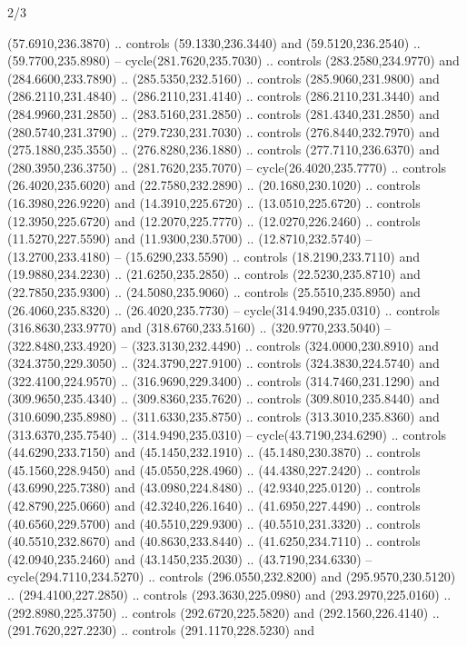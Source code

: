 \begin{flagdescription}{2/3}
\begin{scope}[xshift=0.5\flaglength,yshift=0.5\flagwidth,scale=\stretchfactor]
\begin{scope}[scale=0.001645\flagwidth,yshift=65mm,xshift=-63mm]
\begin{scope}[y=0.80pt, x=0.80pt, yscale=-1,]
\begin{scope}[cm={{1.33333,0.0,0.0,1.33333,(0.0,1e-05)}}]
  (57.6910,236.3870) .. controls (59.1330,236.3440) and (59.5120,236.2540) ..
  (59.7700,235.8980) -- cycle(281.7620,235.7030) .. controls (283.2580,234.9770)
  and (284.6600,233.7890) .. (285.5350,232.5160) .. controls (285.9060,231.9800)
  and (286.2110,231.4840) .. (286.2110,231.4140) .. controls (286.2110,231.3440)
  and (284.9960,231.2850) .. (283.5160,231.2850) .. controls (281.4340,231.2850)
  and (280.5740,231.3790) .. (279.7230,231.7030) .. controls (276.8440,232.7970)
  and (275.1880,235.3550) .. (276.8280,236.1880) .. controls (277.7110,236.6370)
  and (280.3950,236.3750) .. (281.7620,235.7070) -- cycle(26.4020,235.7770) ..
  controls (26.4020,235.6020) and (22.7580,232.2890) .. (20.1680,230.1020) ..
  controls (16.3980,226.9220) and (14.3910,225.6720) .. (13.0510,225.6720) ..
  controls (12.3950,225.6720) and (12.2070,225.7770) .. (12.0270,226.2460) ..
  controls (11.5270,227.5590) and (11.9300,230.5700) .. (12.8710,232.5740) --
  (13.2700,233.4180) -- (15.6290,233.5590) .. controls (18.2190,233.7110) and
  (19.9880,234.2230) .. (21.6250,235.2850) .. controls (22.5230,235.8710) and
  (22.7850,235.9300) .. (24.5080,235.9060) .. controls (25.5510,235.8950) and
  (26.4060,235.8320) .. (26.4020,235.7730) -- cycle(314.9490,235.0310) ..
  controls (316.8630,233.9770) and (318.6760,233.5160) .. (320.9770,233.5040) --
  (322.8480,233.4920) -- (323.3130,232.4490) .. controls (324.0000,230.8910) and
  (324.3750,229.3050) .. (324.3790,227.9100) .. controls (324.3830,224.5740) and
  (322.4100,224.9570) .. (316.9690,229.3400) .. controls (314.7460,231.1290) and
  (309.9650,235.4340) .. (309.8360,235.7620) .. controls (309.8010,235.8440) and
  (310.6090,235.8980) .. (311.6330,235.8750) .. controls (313.3010,235.8360) and
  (313.6370,235.7540) .. (314.9490,235.0310) -- cycle(43.7190,234.6290) ..
  controls (44.6290,233.7150) and (45.1450,232.1910) .. (45.1480,230.3870) ..
  controls (45.1560,228.9450) and (45.0550,228.4960) .. (44.4380,227.2420) ..
  controls (43.6990,225.7380) and (43.0980,224.8480) .. (42.9340,225.0120) ..
  controls (42.8790,225.0660) and (42.3240,226.1640) .. (41.6950,227.4490) ..
  controls (40.6560,229.5700) and (40.5510,229.9300) .. (40.5510,231.3320) ..
  controls (40.5510,232.8670) and (40.8630,233.8440) .. (41.6250,234.7110) ..
  controls (42.0940,235.2460) and (43.1450,235.2030) .. (43.7190,234.6330) --
  cycle(294.7110,234.5270) .. controls (296.0550,232.8200) and
  (295.9570,230.5120) .. (294.4100,227.2850) .. controls (293.3630,225.0980) and
  (293.2970,225.0160) .. (292.8980,225.3750) .. controls (292.6720,225.5820) and
  (292.1560,226.4140) .. (291.7620,227.2230) .. controls (291.1170,228.5230) and

\end{scope}
\end{scope}
\end{scope}
\end{scope}
\end{flagdescription}
